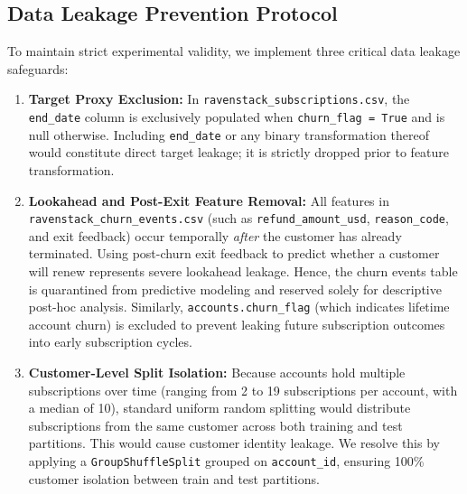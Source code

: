 \documentclass[pdflatex,sn-mathphys-num]{sn-jnl}
\begin{document}
\subsection{Data Leakage Prevention Protocol}
To maintain strict experimental validity, we implement three critical data leakage safeguards:
\begin{enumerate}
    \item \textbf{Target Proxy Exclusion:} In \texttt{ravenstack\_subscriptions.csv}, the \texttt{end\_date} column is exclusively populated when \texttt{churn\_flag = True} and is null otherwise. Including \texttt{end\_date} or any binary transformation thereof would constitute direct target leakage; it is strictly dropped prior to feature transformation.
    \item \textbf{Lookahead and Post-Exit Feature Removal:} All features in \texttt{ravenstack\_churn\_events.csv} (such as \texttt{refund\_amount\_usd}, \texttt{reason\_code}, and exit feedback) occur temporally \textit{after} the customer has already terminated. Using post-churn exit feedback to predict whether a customer will renew represents severe lookahead leakage. Hence, the churn events table is quarantined from predictive modeling and reserved solely for descriptive post-hoc analysis. Similarly, \texttt{accounts.churn\_flag} (which indicates lifetime account churn) is excluded to prevent leaking future subscription outcomes into early subscription cycles.
    \item \textbf{Customer-Level Split Isolation:} Because accounts hold multiple subscriptions over time (ranging from 2 to 19 subscriptions per account, with a median of 10), standard uniform random splitting would distribute subscriptions from the same customer across both training and test partitions. This would cause customer identity leakage. We resolve this by applying a \texttt{GroupShuffleSplit} grouped on \texttt{account\_id}, ensuring 100\% customer isolation between train and test partitions.
\end{enumerate}
\end{document}
